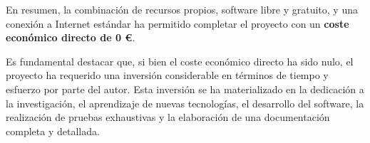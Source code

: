 En resumen, la combinación de recursos propios, software libre y gratuito, y una conexión a Internet estándar ha permitido completar el proyecto con un \textbf{coste económico directo de 0 €}.

Es fundamental destacar que, si bien el coste económico directo ha sido nulo, el proyecto ha requerido una inversión considerable en términos de tiempo y esfuerzo por parte del autor. Esta inversión se ha materializado en la dedicación a la investigación, el aprendizaje de nuevas tecnologías, el desarrollo del software, la realización de pruebas exhaustivas y la elaboración de una documentación completa y detallada.